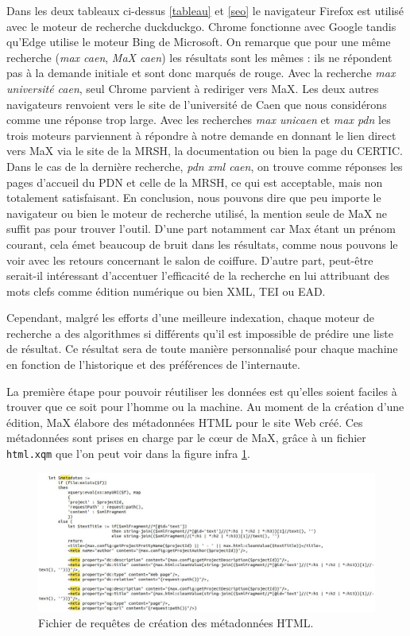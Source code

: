 \documentclass[a4paper,12pt,twoside]{book}
\begin{document}
Dans les deux tableaux ci-dessus \ref{tableau} et \ref{seo} le navigateur Firefox est utilisé avec le moteur de recherche duckduckgo. Chrome fonctionne avec Google tandis qu'Edge utilise le moteur Bing de Microsoft. On remarque que pour une même recherche (\og \textit{max caen}\fg, \og \textit{MaX caen}\fg) les résultats sont les mêmes : ils ne répondent pas à la demande initiale et sont donc marqués de rouge. Avec la recherche \og\textit{max université caen}\fg, seul Chrome parvient à rediriger vers MaX. Les deux autres navigateurs renvoient vers le site de l'université de Caen que nous considérons comme une réponse trop large. Avec les recherches \og \textit{max unicaen}\fg{} et \og \textit{max pdn}\fg{} les trois moteurs parviennent à répondre à notre demande en donnant le lien direct vers MaX via le site de la \acrshort{MRSH}, la documentation ou bien la page du \acrshort{CERTIC}. Dans le cas de la dernière recherche, \og \textit{pdn xml caen}\fg, on trouve comme réponses les pages d'accueil du \acrshort{PDN} et celle de la \acrshort{MRSH}, ce qui est acceptable, mais non totalement satisfaisant. En conclusion, nous pouvons dire que peu importe le navigateur ou bien le moteur de recherche utilisé, la mention seule de MaX ne suffit pas pour trouver l'outil. D'une part notamment car Max étant un prénom courant, cela émet beaucoup de bruit dans les résultats, comme nous pouvons le voir avec les retours concernant le salon de coiffure. D'autre part, peut-être serait-il intéressant d'accentuer l'efficacité de la recherche en lui attribuant des mots clefs comme \og édition numérique\fg{} ou bien \og XML\fg, \og TEI\fg{} ou \og EAD\fg. 

Cependant, malgré les efforts d'une meilleure indexation, chaque moteur de recherche a des algorithmes si différents qu'il est impossible de prédire une liste de résultat. Ce résultat sera de toute manière personnalisé pour chaque machine en fonction de l'historique et des préférences de l'internaute.

La première étape pour pouvoir réutiliser les données est qu'elles soient faciles à trouver que ce soit pour l'homme ou la machine. Au moment de la création d'une édition, MaX élabore des métadonnées \acrshort{HTML} pour le site Web créé. Ces métadonnées sont prises en charge par le c\oe{}ur de MaX, grâce à un fichier \texttt{html.xqm} que l'on peut voir dans la figure infra \ref{metadata}.


\begin{figure}[H]
    \centering
    \includegraphics[width=15cm]{img/partie_2/metadata_max.JPG}
    \caption{Fichier de requêtes de création des métadonnées \acrshort{HTML}.}
    \label{metadata}
\end{figure}
\end{document}
